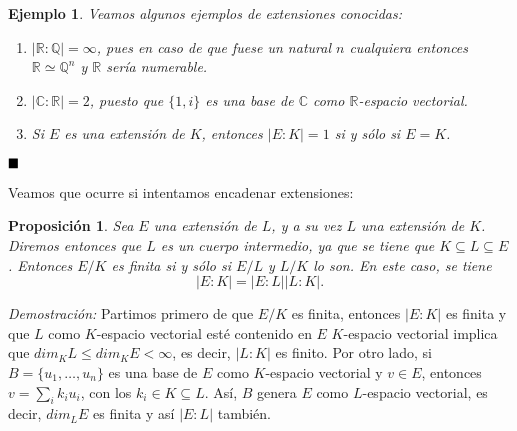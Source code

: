 \documentclass[12pt]{article}
\newtheorem{proposition}[theorem]{Proposición}
\newtheorem{example}{Ejemplo}[theorem]
\begin{document}
\begin{example} Veamos algunos ejemplos de extensiones conocidas: \begin{enumerate}
\item $|\mathbb{R} : \mathbb{Q}| = \infty$, pues en caso de que fuese un natural $n$ cualquiera entonces $\mathbb{R} \simeq \mathbb{Q}^{n}$ y $\mathbb{R}$ sería numerable.
\item $|\mathbb{C} : \mathbb{R} | = 2$, puesto que $\lbrace 1, i \rbrace$ es una base de $\mathbb{C}$ como $\mathbb{R}$-espacio vectorial.
\item Si $E$ es una extensión de $K$, entonces $|E : K | = 1$ si y sólo si $E = K$.
\end{enumerate}
\end{example}

$\hfill \blacksquare$

Veamos que ocurre si intentamos encadenar extensiones:

\begin{proposition} \label{eq:trgr} Sea $E$ una extensión de $L$, y a su vez $L$ una extensión de $K$. Diremos entonces que $L$ es un cuerpo intermedio, ya que se tiene que $K \subseteq L \subseteq E$. Entonces $E/K$ es finita si y sólo si $E/L$ y $L/K$ lo son. En este caso, se tiene $$|E: K| = |E:L| |L:K|.$$
\end{proposition}
\emph{Demostración: } Partimos primero de que $E/K$ es finita, entonces $|E:K|$ es finita y que $L$ como $K$-espacio vectorial esté contenido en $E$ $K$-espacio vectorial implica que $dim_{K} L \leq dim_{K} E < \infty$, es decir, $|L:K|$ es finito. Por otro lado, si $B = \lbrace u_{1}, \ldots, u_{n}\rbrace$ es una base de $E$ como $K$-espacio vectorial y $v \in E$, entonces $v = \sum_{i} k_{i}u_{i}$, con los $k_{i} \in K \subseteq L$. Así, $B$ genera $E$ como $L$-espacio vectorial, es decir, $dim_{L}E$ es finita y así $|E:L|$ también.
\end{document}
